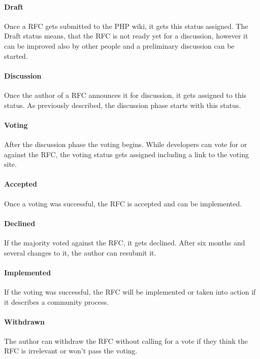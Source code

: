 \paragraph{Draft}

Once a \ac{RFC} gets submitted to the PHP wiki, it gets this status assigned.
The Draft status means, that the \ac{RFC} is not ready yet for a discussion,
however it can be improved also by other people and a preliminary discussion
can be started.

\paragraph{Discussion}

Once the author of a \ac{RFC} announces it for discussion, it gets assigned to
this status. As previously described, the discussion phase starts with this
status.

\paragraph{Voting}

After the discussion phase the voting begins. While developers can vote for or
against the \ac{RFC}, the voting status gets assigned including a link to the
voting site.

\paragraph{Accepted}

Once a voting was successful, the \ac{RFC} is accepted and can be implemented.


\paragraph{Declined}

If the majority voted against the \ac{RFC}, it gets declined. After six months
and several changes to it, the author can resubmit it.

\paragraph{Implemented}

If the voting was successful, the \ac{RFC} will be implemented or taken into
action if it describes a community process.

\paragraph{Withdrawn}

The author can withdraw the \ac{RFC} without calling for a vote if they think
the \ac{RFC} is irrelevant or won't pass the voting.


